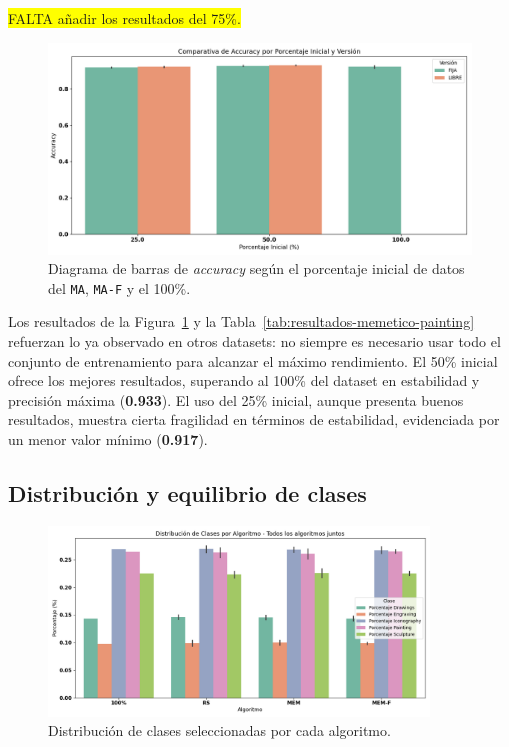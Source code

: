 \colorbox{yellow}{FALTA añadir los resultados del 75\%.}


\begin{figure}[htp]
    \centering
    \includegraphics[width=1\textwidth]{imagenes/evaluaciones/painting/comparacion-por-porcentaje.png}
    \caption{Diagrama de barras de \textit{accuracy} según el porcentaje inicial de datos del \texttt{MA}, \texttt{MA-F} y el 100\%.}
    \label{fig:accuracy_porcentaje_painting}
\end{figure}

Los resultados de la Figura~\ref{fig:accuracy_porcentaje_painting} y la Tabla~\ref{tab:resultados-memetico-painting} refuerzan lo ya observado en otros datasets:
no siempre es necesario usar todo el conjunto de entrenamiento para alcanzar el máximo rendimiento.
El 50\% inicial ofrece los mejores resultados, superando al 100\% del dataset en estabilidad y precisión máxima (\textbf{0.933}).
El uso del 25\% inicial, aunque presenta buenos resultados, muestra cierta fragilidad en términos de estabilidad, evidenciada por un menor valor mínimo (\textbf{0.917}).

\subsection{Distribución y equilibrio de clases}

\begin{figure}[htp]
    \centering
    \includegraphics[width=0.9\textwidth]{imagenes/evaluaciones/painting/balance-de-clases-por-algoritmo.png}
    \caption{Distribución de clases seleccionadas por cada algoritmo.}
    \label{fig:balance_clases_painting}
\end{figure}

